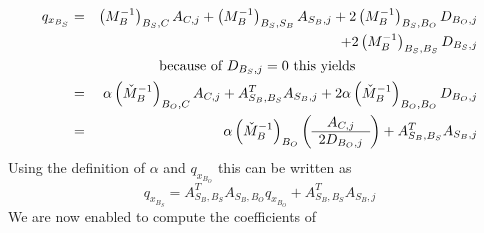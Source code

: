 \documentclass[a4paper]{article}
\begin{document}
\begin{eqnarray}
q_{x_{B_{S}}}
&=&
\left(M_{B}^{-1}\right)_{B_{S},C}A_{C,j}
+\left(M_{B}^{-1}\right)_{B_{S}, S_{B}}A_{S_{B}, j}
+2\left(M_{B}^{-1}\right)_{B_{S}, B_{O}}D_{B_{O}, j}
\nonumber \\
&&
+2\left(M_{B}^{-1}\right)_{B_{S}, B_{S}}D_{B_{S}, j}
\nonumber \\
&&\begin{minipage}{8cm}
because of $D_{B_{S},j}=0$ this yields
\end{minipage}
\nonumber \\
&=&
\alpha\left(\check{M}_{B}^{-1}\right)_{B_{O}, C}A_{C, j}
+A_{S_{B}, B_{S}}^{T}A_{S_{B}, j}
+2\alpha\left(\check{M}_{B}^{-1}\right)_{B_{O}, B_{O}}D_{B_{O},j}
\nonumber \\
&=&
\alpha\left(\check{M}_{B}^{-1}\right)_{B_{O}}
\left(\begin{array}{c}
        A_{C,j} \\
	\hline
	2D_{B_{O}, j}
       \end{array}
\right)
+A_{S_{B}, B_{S}}^{T}A_{S_{B}, j}
\nonumber
\end{eqnarray}
Using the definition of $\alpha$ and $q_{x_{B_{O}}}$ this can be written as
\begin{equation}
q_{x_{B_{S}}}=
A_{S_{B}, B_{S}}^{T}A_{S_{B}, B_{O}}q_{x_{B_{O}}}
+A_{S_{B}, B_{S}}^{T}A_{S_{B}, j}
\end{equation}
We are now enabled to compute the coefficients of
\end{document}
